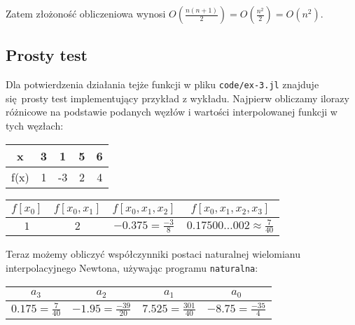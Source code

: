 \documentclass[10pt]{article}
\begin{document}
\noindent Zatem złożoność obliczeniowa wynosi $O\left( \frac{n(n+1)}{2} \right) = O\left( \frac{n^2}{2} \right) = O(n^2)$.

\subsection{Prosty test}

Dla potwierdzenia działania tejże funkcji w pliku \texttt{code/ex-3.jl} znajduje się prosty test implementujący przykład z wykładu. Najpierw obliczamy ilorazy różnicowe na podstawie podanych węzłów i wartości interpolowanej funkcji w tych węzłach:
\begin{center}
    \begin{tabular}{c || c c c c}
        x & 3 & 1 & 5 & 6\\
        \hline
        f(x) & 1 & -3 & 2 & 4\\
    \end{tabular}
\end{center}

\begin{center}
    \begin{tabular}{c c c c}
        $f[x_0]$ & $f[x_0,x_1]$ & $f[x_0,x_1,x_2]$ & $f[x_0,x_1,x_2,x_3]$\\
        \hline
        $1$ & $2$ & $-0.375 = \frac{-3}{8}$ & $0.17500\dots002 \approx \frac{7}{40}$
    \end{tabular}
\end{center}

Teraz możemy obliczyć współczynniki postaci naturalnej wielomianu interpolacyjnego Newtona, używając programu \texttt{naturalna}:
\begin{center}
    \begin{tabular}{c c c c}
        $a_3$ & $a_2$ & $a_1$ & $a_0$\\
        \hline
        $0.175 = \frac{7}{40}$ & $-1.95 = \frac{-39}{20}$ & $7.525 = \frac{301}{40}$ & $-8.75 = \frac{-35}{4}$\\
    \end{tabular}
\end{center}
\end{document}
